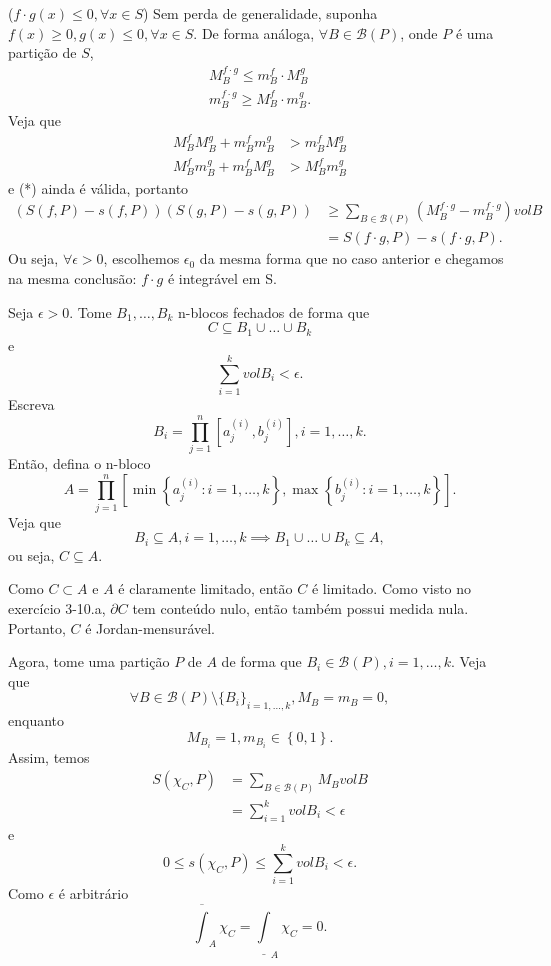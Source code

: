 \documentclass[a4paper]{report}
\begin{document}
($f\cdot g\left( x \right) \le 0, \forall x\in S$)
Sem perda de generalidade, suponha $f\left( x \right) \ge 0, g\left( x \right) \le 0, \forall x\in S$. De forma análoga, $\forall B\in \mathcal{B}\left( P \right) $, onde $P$ é uma partição de $S$,
\begin{align*}
    M_B^{f\cdot g} \le  m_B^{f} \cdot M_B^{g} \\
    m_B^{f\cdot g} \ge   M_B^{f} \cdot m_B^{g}
.\end{align*}
Veja que
\begin{align*}
    M_B^{f}M_B^{g} + m_B^{f}m_B^{g} &> m_B^{f}M_B^{g} \\
    M_B^{f}m_B^{g} + m_B^{f}M_B^{g} &> M_B^{f}m_B^{g}
\end{align*}
e (*) ainda é válida, portanto
\begin{align*}
    \left( S\left( f,P \right) - s\left( f,P \right) \right) \left( S\left( g,P \right) - s\left( g,P \right) \right) &\ge   \sum_{B\in \mathcal{B}\left( P \right) } \left( M_B^{f\cdot g} - m_B^{f\cdot g} \right) vol B \\
															 &= S\left( f\cdot g, P \right) - s\left( f\cdot g, P \right) 
.\end{align*}
Ou seja, $\forall \epsilon>0$, escolhemos $\epsilon_0$ da mesma forma que no caso anterior e chegamos na mesma conclusão: $f\cdot g$ é integrável em S.


Seja $\epsilon > 0$. Tome $B_1,\ldots,B_k$ n-blocos fechados de forma que \[
C\subseteq B_1\cup \ldots\cup B_k
\] e \[
\sum_{i=1}^{k} vol B_i < \epsilon
.\] Escreva \[
B_i = \prod_{j=1}^{n} \left[ a^{(i)}_j, b^{(i)}_j \right] , i=1,\ldots,k
.\] Então, defina o n-bloco \[
A = \prod_{j=1}^{n} \left[ \min\left\{ a^{(i)}_j :i=1,\ldots,k\right\}, \max\left\{ b^{(i)}_j :i=1,\ldots,k\right\}  \right]  
.\] Veja que \[
B_i \subseteq A, i=1,\ldots,k \implies B_1\cup \ldots\cup B_k \subseteq A  
,\] ou seja, $C \subseteq A$.

Como $C\subset A$ e $A$ é claramente limitado, então $C$ é limitado. Como visto no exercício 3-10.a, $\partial C$ tem conteúdo nulo, então também possui medida nula. Portanto, $C$ é Jordan-mensurável.

Agora, tome uma partição $P$ de $A$ de forma que $B_i \in \mathcal{B}\left( P \right) , i=1,\ldots,k$. Veja que \[
\forall B \in \mathcal{B}\left( P \right) \setminus \{B_i\} _{i=1,\ldots,k}, M_B = m_B = 0
,\] enquanto \[
M_{B_i} = 1, m_{B_i} \in \left\{ 0,1 \right\} 
.\] Assim, temos
\begin{align*}
    S\left( \chi_C, P \right) &= \sum_{B \in \mathcal{B}\left( P \right) } M_B vol B \\
    &= \sum_{i=1}^{k} vol B_i < \epsilon
\end{align*}
e \[
    0 \le s\left( \chi_C, P \right) \le \sum_{i=1}^{k} vol B_i < \epsilon
.\] Como $\epsilon$ é arbitrário \[
\overline{\int}_A \chi_C = \underline{\int}_A \chi_C = 0
.\] 
\end{document}
